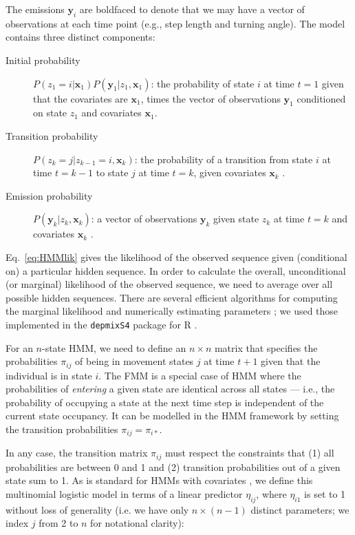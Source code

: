\documentclass{bmcart}
\newcommand{\obs}{\mathbf{y}}
\newcommand{\cov}{\mathbf{x}}
\newcommand{\state}{z}
\begin{document}
The emissions $\obs_i$ are boldfaced to denote that we may have a vector of observations at each time point (e.g., step length and turning angle).
The model contains three distinct components:

\begin{description}
\item[Initial probability] $P(\state_{1} = i | \cov_{1}) P(\obs_{1} | \state_{1}, \cov_{1} )$: the probability of state $i$ at time $t=1$ given that the covariates are $\cov_{1}$, times the vector of observations $\obs_{1}$ conditioned on state $\state_{1}$ and covariates $\cov_{1}$.

\item[Transition probability] $P(\state_{k}=j | \state_{k-1}=i,\cov_{k})$: the probability of a transition from state $i$ at time $t=k-1$ to state $j$ at time $t=k$, given covariates $\cov_{k}$ .


\item[Emission probability] $P(\obs_{k} | \state_{k},\cov_{k})$: a vector of observations $\obs_{k}$ given state $\state_{k}$ at time $t=k$ and covariates $\cov_{k}$ .
\end{description}

Eq.~\ref{eq:HMMlik} gives the likelihood of the observed sequence 
given (conditional on) a particular
hidden sequence. 
In order to calculate the overall, unconditional (or marginal) 
likelihood of the 
observed sequence, we need to average over all possible hidden sequences. 
There are several efficient algorithms for computing the marginal likelihood and
numerically estimating parameters \cite{zucchini_hidden_2009};
we used those implemented in the \texttt{depmixS4} package for R
\cite{visser2010depmixs4,R}.

For an $n$-state HMM, we need to define an $n \times n$ matrix that specifies the probabilities
$\pi_{ij}$ of being in movement states $j$ at time $t+1$ given that the individual is in state $i$. The FMM is a special case of HMM where the probabilities of \emph{entering} a given state are 
identical across all states --- i.e., the probability of occupying a state at the next time step 
is independent of the current state occupancy. It can be modelled in the HMM framework by setting 
the transition probabilities  $\pi_{ij} = \pi_{i*}$.

In any case, the transition matrix $\pi_{ij}$ must respect the constraints that (1) all 
probabilities are between 0 and 1 and (2) transition probabilities out of a given state sum to 1.
As is standard for HMMs with covariates \cite{visser2010depmixs4}, we define this multinomial 
logistic model in terms of a linear predictor $\eta_{ij}$, where $\eta_{i1}$ is set to 1 without 
loss of generality (i.e. we have only $n \times (n-1)$ distinct parameters; we index $j$ from 2 to 
$n$ for notational clarity):
\end{document}
